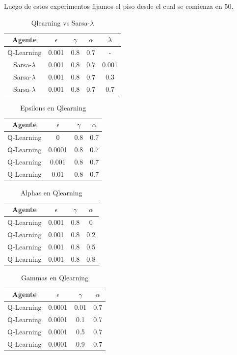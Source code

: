 \documentclass[11pt, a4paper]{article}
\newcommand{\slambda}{Sarsa-$\lambda$ }
\begin{document}
Luego de estos experimentos fijamos el piso desde el cual se comienza en 50.

\begin{table}[h!]
\center
\begin{tabular}{ | c | c | c | c | c| }
  \hline
  Agente & $\epsilon$ & $\gamma$ & $\alpha$ & $\lambda$ \\
  \hline 
 	 Q-Learning  & 0.001  & 0.8  & 0.7 & - \\
	\slambda & 0.001  & 0.8  & 0.7 & 0.001 \\
	\slambda & 0.001  & 0.8  & 0.7 & 0.3 \\
	\slambda  & 0.001  & 0.8  & 0.7 & 0.7\\
  \hline

\end{tabular}
\caption {Qlearning vs \slambda}
\end{table}

\begin{table}[h!]
\center
\begin{tabular}{ | c | c | c | c | }
  \hline
  Agente & $\epsilon$ & $\gamma$ & $\alpha$ \\
  \hline 
 	 Q-Learning  & 0  & 0.8  & 0.7 \\
	 Q-Learning  & 0.0001  & 0.8  & 0.7 \\
	 Q-Learning  & 0.001  & 0.8  & 0.7 \\
	 Q-Learning  & 0.01  & 0.8  & 0.7 \\
  \hline
\end{tabular}
\caption {Epsilons en Qlearning}
\end{table}

\begin{table}[h!]
\center
\begin{tabular}{ | c | c | c | c | }
  \hline
  Agente & $\epsilon$ & $\gamma$ & $\alpha$ \\
  \hline 
 	 Q-Learning  & 0.001  & 0.8  & 0 \\
	 Q-Learning  & 0.001  & 0.8  & 0.2 \\
	 Q-Learning  & 0.001  & 0.8  & 0.5 \\
	 Q-Learning  & 0.001  & 0.8  & 0.8 \\
  \hline
\end{tabular}
\caption {Alphas en Qlearning}
\end{table}

\begin{table}[h!]
\center
\begin{tabular}{ | c | c | c | c | }
  \hline
  Agente & $\epsilon$ & $\gamma$ & $\alpha$ \\
  \hline 
 	 Q-Learning  & 0.0001  & 0.01  & 0.7 \\
	 Q-Learning  & 0.0001  & 0.1  & 0.7 \\
	 Q-Learning  & 0.0001  & 0.5  & 0.7 \\
	 Q-Learning  & 0.0001  & 0.9  & 0.7 \\
  \hline
\end{tabular}
\caption {Gammas en Qlearning}
\end{table}
\end{document}
